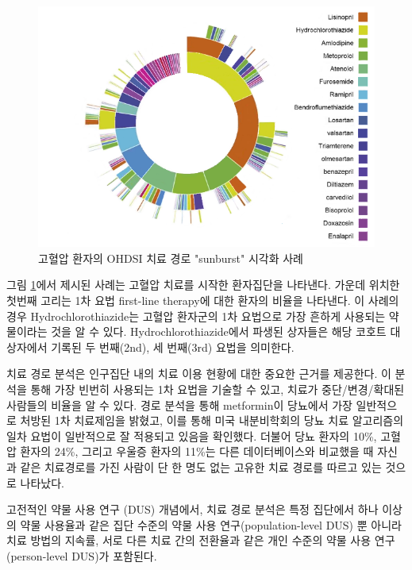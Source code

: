 \documentclass[11pt]{book}
\theoremstyle{definition}
\theoremstyle{definition}
\theoremstyle{definition}
\theoremstyle{remark}
\begin{document}
\begin{figure}

{\centering \includegraphics[width=1\linewidth]{images/Characterization/pnasTreatmentPathwaysSunburst} 

}

\caption{고혈압 환자의 OHDSI 치료 경로 "sunburst" 시각화 사례}\label{fig:treatmentPathwaysSunburstDataViz}
\end{figure}

그림 \ref{fig:treatmentPathwaysSunburstDataViz}에서 제시된 사례는 고혈압
치료를 시작한 환자집단을 나타낸다. 가운데 위치한 첫번째 고리는 1차 요법
first-line therapy에 대한 환자의 비율을 나타낸다. 이 사례의 경우
Hydrochlorothiazide는 고혈압 환자군의 1차 요법으로 가장 흔하게 사용되는
약물이라는 것을 알 수 있다. Hydrochlorothiazide에서 파생된 상자들은 해당
코호트 대상자에서 기록된 두 번째(2nd), 세 번째(3rd) 요법을 의미한다.

치료 경로 분석은 인구집단 내의 치료 이용 현황에 대한 중요한 근거를
제공한다. 이 분석을 통해 가장 빈번히 사용되는 1차 요법을 기술할 수 있고,
치료가 중단/변경/확대된 사람들의 비율을 알 수 있다. 경로 분석을 통해
metformin이 당뇨에서 가장 일반적으로 처방된 1차 치료제임을 밝혔고, 이를
통해 미국 내분비학회의 당뇨 치료 알고리즘의 일차 요법이 일반적으로 잘
적용되고 있음을 확인했다. 더불어 당뇨 환자의 10\%, 고혈압 환자의 24\%,
그리고 우울증 환자의 11\%는 다른 데이터베이스와 비교했을 때 자신과 같은
치료경로를 가진 사람이 단 한 명도 없는 고유한 치료 경로를 따르고 있는
것으로 나타났다.

고전적인 약물 사용 연구 (DUS) 개념에서, 치료 경로 분석은 특정 집단에서
하나 이상의 약물 사용율과 같은 집단 수준의 약물 사용
연구(population-level DUS) 뿐 아니라 치료 방법의 지속률, 서로 다른 치료
간의 전환율과 같은 개인 수준의 약물 사용 연구(person-level DUS)가
포함된다.
\end{document}

